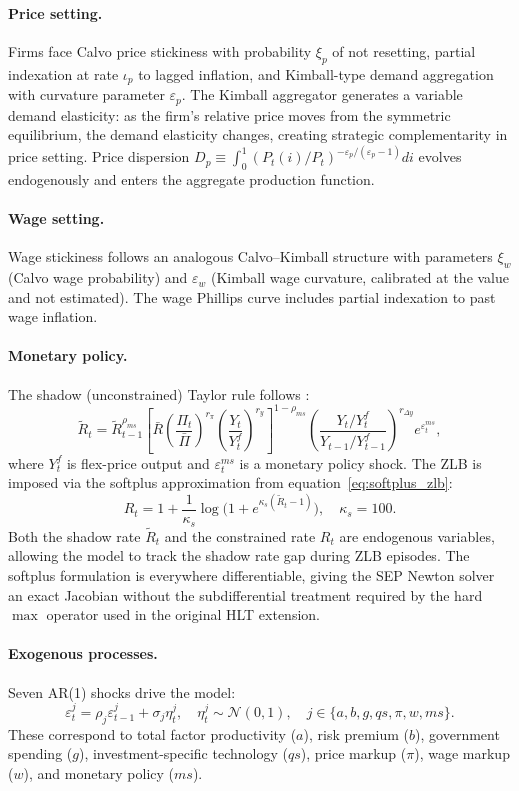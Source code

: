 \documentclass[12pt]{article}
\theoremstyle{plain}
\theoremstyle{definition}
\theoremstyle{remark}
\begin{document}
\paragraph{Price setting.} Firms face Calvo price stickiness with probability $\xi_p$ of not resetting, partial indexation at rate $\iota_p$ to lagged inflation, and Kimball-type demand aggregation with curvature parameter $\varepsilon_p$. The Kimball aggregator generates a variable demand elasticity: as the firm's relative price moves from the symmetric equilibrium, the demand elasticity changes, creating strategic complementarity in price setting. Price dispersion $D_p \equiv \int_0^1 (P_t(i)/P_t)^{-\varepsilon_p/(\varepsilon_p - 1)} di$ evolves endogenously and enters the aggregate production function.

\paragraph{Wage setting.} Wage stickiness follows an analogous Calvo--Kimball structure with parameters $\xi_w$ (Calvo wage probability) and $\varepsilon_w$ (Kimball wage curvature, calibrated at the \citet{smets2007shocks} value and not estimated). The wage Phillips curve includes partial indexation to past wage inflation.

\paragraph{Monetary policy.} The shadow (unconstrained) Taylor rule follows \citet{smets2007shocks}:
\[
\tilde{R}_t = \tilde{R}_{t-1}^{\rho_{ms}} \!\left[\bar{R}\left(\frac{\Pi_t}{\bar{\Pi}}\right)^{r_\pi} \!\left(\frac{Y_t}{Y_t^f}\right)^{r_y}\right]^{1-\rho_{ms}} \!\left(\frac{Y_t/Y_t^f}{Y_{t-1}/Y_{t-1}^f}\right)^{r_{\Delta y}} e^{\varepsilon_t^{ms}},
\]
where $Y_t^f$ is flex-price output and $\varepsilon_t^{ms}$ is a monetary policy shock. The ZLB is imposed via the softplus approximation from equation~\eqref{eq:softplus_zlb}:
\[
R_t = 1 + \frac{1}{\kappa_s}\log\!\bigl(1 + e^{\kappa_s(\tilde{R}_t - 1)}\bigr), \quad \kappa_s = 100.
\]
Both the shadow rate $\tilde{R}_t$ and the constrained rate $R_t$ are endogenous variables, allowing the model to track the shadow rate gap during ZLB episodes. The softplus formulation is everywhere differentiable, giving the SEP Newton solver an exact Jacobian without the subdifferential treatment required by the hard $\max$ operator used in the original HLT extension.

\paragraph{Exogenous processes.} Seven AR(1) shocks drive the model:
\[
\varepsilon_t^j = \rho_j \varepsilon_{t-1}^j + \sigma_j \eta_t^j, \quad \eta_t^j \sim \mathcal{N}(0,1), \quad j \in \{a, b, g, qs, \pi, w, ms\}.
\]
These correspond to total factor productivity ($a$), risk premium ($b$), government spending ($g$), investment-specific technology ($qs$), price markup ($\pi$), wage markup ($w$), and monetary policy ($ms$).
\end{document}
